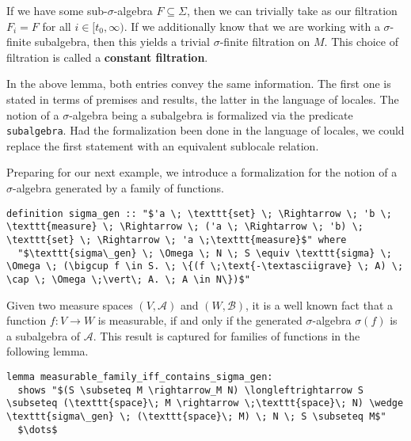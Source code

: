 If we have some sub-$\sigma$-algebra $F \subseteq \Sigma$, then we can trivially take as our filtration $F_i = F$ for all $i \in [t_0,\infty)$. If we additionally know that we are working with a $\sigma$-finite subalgebra, then this yields a trivial $\sigma$-finite filtration on $M$. This choice of filtration is called a \textbf{constant filtration}. 

\begin{remark}
	In the above lemma, both entries convey the same information. The first one is stated in terms of premises and results, the latter in the language of locales. The notion of a $\sigma$-algebra being a subalgebra is formalized via the predicate \texttt{subalgebra}. Had the formalization been done in the language of locales, we could replace the first statement with an equivalent sublocale relation.
\end{remark}

Preparing for our next example, we introduce a formalization for the notion of a $\sigma$-algebra generated by a family of functions.

\begin{isadefinition}
{\small
\begin{lstlisting}[style=isabelle]
definition sigma_gen :: "$'a \; \texttt{set} \; \Rightarrow \; 'b \; \texttt{measure} \; \Rightarrow \; ('a \; \Rightarrow \; 'b) \; \texttt{set} \; \Rightarrow \; 'a \;\texttt{measure}$" where
  "$\texttt{sigma\_gen} \; \Omega \; N \; S \equiv \texttt{sigma} \; \Omega \; (\bigcup f \in S. \; \{(f \;\text{-\textasciigrave} \; A) \; \cap \; \Omega \;\vert\; A. \; A \in N\})$"
\end{lstlisting}
}
\end{isadefinition}

Given two measure spaces $(V, \mathcal{A})$ and $(W, \mathcal{B})$, it is a well known fact that a function $f : V \rightarrow W$ is measurable, if and only if the generated $\sigma$-algebra $\sigma(f)$ is a subalgebra of $\mathcal{A}$. This result is captured for families of functions in the following lemma.

\begin{isalemma}
{\small
\begin{lstlisting}[style=isabelle]
lemma measurable_family_iff_contains_sigma_gen:
  shows "$(S \subseteq M \rightarrow_M N) \longleftrightarrow S \subseteq (\texttt{space}\; M \rightarrow \;\texttt{space}\; N) \wedge \texttt{sigma\_gen} \; (\texttt{space}\; M) \; N \; S \subseteq M$"
  $\dots$
\end{lstlisting}
}
\end{isalemma}


